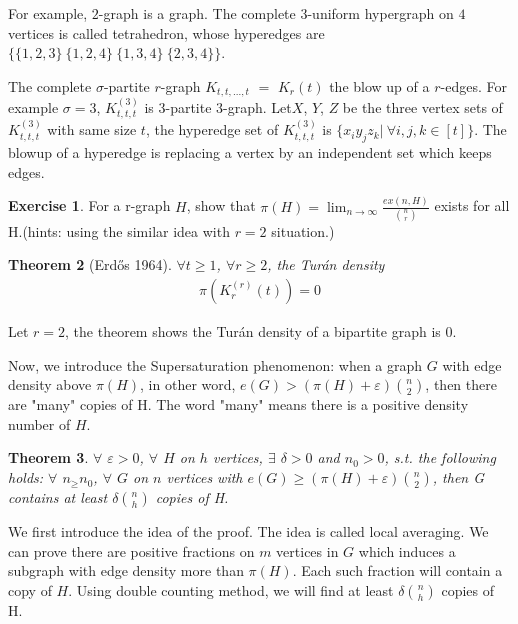 \documentclass{article}
\newtheorem{theorem}{Theorem}[section]
\theoremstyle{definition}
\newtheorem{exercise}[theorem]{Exercise}
\def\Erdos{Erd\H{o}s}
\def\Turan{Tur\'an}
\renewcommand{\epsilon}{\varepsilon}
\begin{document}
For example, $2$-graph is a graph. The complete $3$-uniform hypergraph on $4$ vertices is called tetrahedron, whose hyperedges are $\{\{1,2,3\}\ \{1,2,4\}\ \{1,3,4\}\ \{2,3,4\} \}$.

The complete $\sigma$-partite $r$-graph $K_{t,t,...,t}$ $=$ $K_r(t)$ the blow up of a $r$-edges. For example $\sigma=3$, $K_{t,t,t}^{(3)}$ is $3$-partite $3$-graph. Let$X$, $Y$, $Z$ be the three vertex sets of $K_{t,t,t}^{(3)}$ with same size $t$, the hyperedge set of $K_{t,t,t}^{(3)}$ is $\{x_iy_jz_k| 
\ \forall i,j,k\in [t]\}$. The blowup of a hyperedge is replacing a vertex by an independent set which keeps edges. 

\begin{exercise}
    For a r-graph $H$, show that $\pi(H)=\lim_{n\rightarrow\infty}\frac{ex(n,H)}{\binom{n}{r}}$ exists for all H.(hints: using the similar idea with $r=2$ situation.)
\end{exercise}

\begin{theorem}[\Erdos{} 1964\cite{10.1007/BFb0066181}]
$\forall t\geq 1$, $\forall r\geq 2$, the \Turan{} density 
\begin{align*}
    \pi(K_r^{(r)}(t))=0
\end{align*}
\end{theorem}
 Let $r=2$, the theorem shows the \Turan{} density of a bipartite graph is $0$.

Now, we introduce the Supersaturation phenomenon: when a graph $G$ with edge density above $\pi(H)$, in other word, $e(G)>(\pi(H)+\epsilon)\binom{n}{2}$, then there are "many" copies of H. The word "many" means there is a positive density number of $H$.
\begin{theorem}\label{thm5.4}
    $\forall$ $\epsilon>0$, $\forall$ $H$ on $h$ vertices, $\exists $ $\delta>0$ and $n_0>0$, s.t. the following holds: $\forall$ $n_\geq n_0$, $\forall$ $G$ on $n$ vertices with $e(G)\geq(\pi(H)+\epsilon)\binom{n}{2}$, then G contains at least $\delta\binom{n}{h}$ copies of H.
\end{theorem}

We first introduce the idea of the proof. The idea is called local averaging. We can prove there are positive fractions on $m$ vertices in $G$ which induces a subgraph with edge density more than $\pi(H)$. Each such fraction will contain a copy of $H$. Using double counting method, we will find  at least $\delta\binom{n}{h}$ copies of H.
\end{document}
